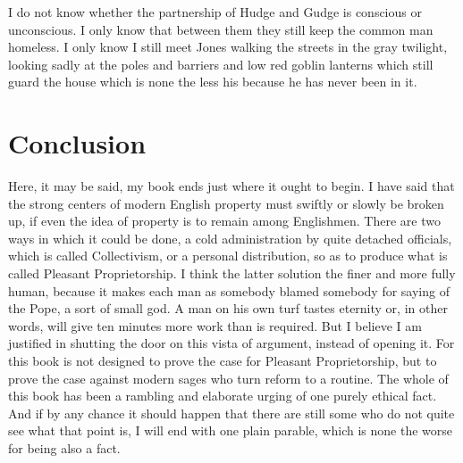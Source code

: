 \documentclass{book}
\begin{document}
I do not know whether the partnership of Hudge and Gudge is conscious or unconscious. I only know that between them they still keep the common man homeless. I only know I still meet Jones walking the streets in the gray twilight, looking sadly at the poles and barriers and low red goblin lanterns which still guard the house which is none the less his because he has never been in it.

\chapter{Conclusion}
\label{chapter-51}
Here, it may be said, my book ends just where it ought to begin. I have said that the strong centers of modern English property must swiftly or slowly be broken up, if even the idea of property is to remain among Englishmen. There are two ways in which it could be done, a cold administration by quite detached officials, which is called Collectivism, or a personal distribution, so as to produce what is called Pleasant Proprietorship. I think the latter solution the finer and more fully human, because it makes each man as somebody blamed somebody for saying of the Pope, a sort of small god. A man on his own turf tastes eternity or, in other words, will give ten minutes more work than is required. But I believe I am justified in shutting the door on this vista of argument, instead of opening it. For this book is not designed to prove the case for Pleasant Proprietorship, but to prove the case against modern sages who turn reform to a routine. The whole of this book has been a rambling and elaborate urging of one purely ethical fact. And if by any chance it should happen that there are still some who do not quite see what that point is, I will end with one plain parable, which is none the worse for being also a fact.
\end{document}
